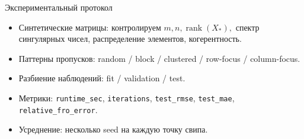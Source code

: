 \documentclass[aspectratio=169,xcolor=dvipsnames]{beamer}
\newcommand{\rank}{\operatorname{rank}}
\begin{document}
\begin{frame}{Экспериментальный протокол}
    \small
    \begin{itemize}
        \item Синтетические матрицы: контролируем \(m,n,\rank(X_*),\) спектр сингулярных чисел, распределение элементов, когерентность.
        \item Паттерны пропусков: random / block / clustered / row-focus / column-focus.
        \item Разбиение наблюдений: fit / validation / test.
        \item Метрики: \texttt{runtime\_sec}, \texttt{iterations}, \texttt{test\_rmse}, \texttt{test\_mae}, \texttt{relative\_fro\_error}.
        \item Усреднение: несколько seed на каждую точку свипа.
    \end{itemize}
\end{frame}
\end{document}
